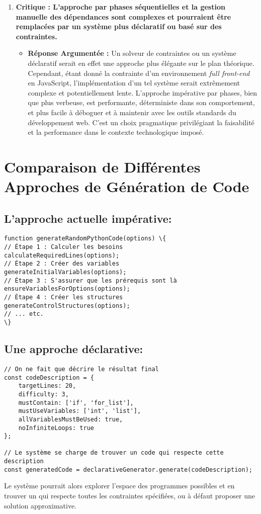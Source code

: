 \documentclass[a4paper, 11pt]{article}
\begin{document}
\begin{tcolorbox}[colback=red!5!white,colframe=red!75!black,title=Critiques Académiques Potentielles]
\begin{enumerate}
        \item \textbf{Critique : L'approche par phases séquentielles et la gestion manuelle des dépendances sont complexes et pourraient être remplacées par un système plus déclaratif ou basé sur des contraintes.}
        \begin{itemize}
            \item \textbf{Réponse Argumentée :} Un solveur de contraintes ou un système déclaratif serait en effet une approche plus élégante sur le plan théorique. Cependant, étant donné la contrainte d'un environnement \textit{full front-end} en JavaScript, l'implémentation d'un tel système serait extrêmement complexe et potentiellement lente. L'approche impérative par phases, bien que plus verbeuse, est performante, déterministe dans son comportement, et plus facile à déboguer et à maintenir avec les outils standards du développement web. C'est un choix pragmatique privilégiant la faisabilité et la performance dans le contexte technologique imposé.
        \end{itemize}
    \end{enumerate}
\end{tcolorbox}

\section{Comparaison de Différentes Approches de Génération de Code}
\subsection{L'approche actuelle impérative:}
\begin{verbatim}
function generateRandomPythonCode(options) \{
// Étape 1 : Calculer les besoins
calculateRequiredLines(options);
// Étape 2 : Créer des variables
generateInitialVariables(options);
// Étape 3 : S'assurer que les prérequis sont là
ensureVariablesForOptions(options);
// Étape 4 : Créer les structures
generateControlStructures(options);
// ... etc.
\}
\end{verbatim}

\subsection{Une approche déclarative:}
\begin{verbatim}
// On ne fait que décrire le résultat final
const codeDescription = {
    targetLines: 20,
    difficulty: 3,
    mustContain: ['if', 'for_list'],
    mustUseVariables: ['int', 'list'],
    allVariablesMustBeUsed: true,
    noInfiniteLoops: true
};

// Le système se charge de trouver un code qui respecte cette description
const generatedCode = declarativeGenerator.generate(codeDescription);
\end{verbatim}
Le système pourrait alors explorer l'espace des programmes possibles et en trouver un qui respecte toutes les contraintes spécifiées, ou à défaut proposer une solution approximative.
\end{document}
